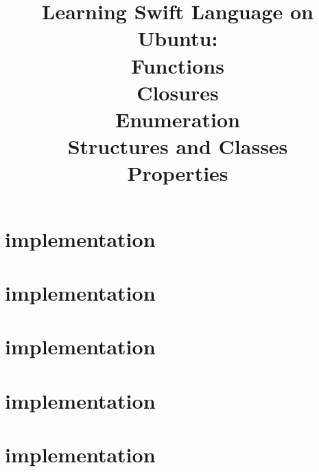 \documentclass[uplatex,dvipdfmx]{jsarticle} \usepackage{amsmath,amssymb,bm}
\title{Learning Swift Language on Ubuntu:\\Functions\\Closures\\Enumeration\\Structures and Classes\\Properties} \author{} \date{}
\begin{document}
\maketitle

\section*{implementation}


\section*{implementation}


\section*{implementation}


\section*{implementation}


\section*{implementation}





\vspace{\baselineskip}
\begin{paracol}{2}
\switchcolumn
\end{paracol}
\end{document}
